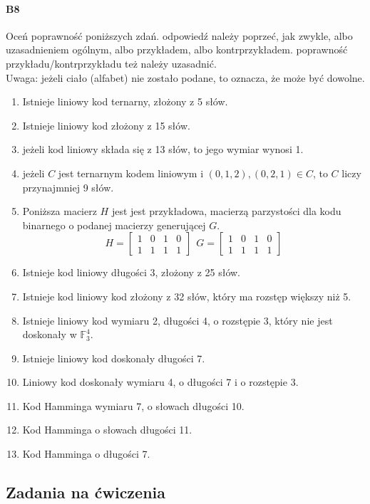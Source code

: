 \paragraph{B8} Oceń poprawność poniższych zdań. odpowiedź należy poprzeć, jak zwykle, albo uzasadnieniem ogólnym, albo przykładem, albo kontrprzykładem. poprawność przykładu/kontrprzykładu też należy uzasadnić. \\Uwaga: jeżeli
ciało (alfabet) nie zostało podane, to oznacza, że może być dowolne.
\begin{enumerate}[label=\alph*)]
\item Istnieje liniowy kod ternarny, złożony z 5 słów.
\item Istnieje liniowy kod złożony z 15 słów.
\item jeżeli kod liniowy składa się z 13 słów, to jego wymiar wynosi 1.
\item jeżeli $C$ jest ternarnym kodem liniowym i $(0, 1, 2),(0, 2, 1) \in C$, to $C$ liczy przynajmniej 9 słów.
\item Poniższa macierz $H$ jest jest przykładowa, macierzą parzystości dla kodu binarnego o podanej macierzy generującej $G$.
$$H =
\begin{bmatrix}
1& 0& 1& 0\\
1& 1 &1& 1 
\end{bmatrix}\ \ 
G =
\begin{bmatrix}
1& 0& 1& 0\\
1& 1& 1& 1 
\end{bmatrix}$$
\item Istnieje kod liniowy długości 3, złożony z 25 słów.
\item Istnieje kod liniowy kod złożony z 32 słów, który ma rozstęp większy niż 5.
\item Istnieje liniowy kod wymiaru 2, długości 4, o rozstępie 3, który nie jest doskonały w $\mathbb{F}^4_3$.
\item Istnieje liniowy kod doskonały długości 7.
\item Liniowy kod doskonały wymiaru 4, o długości 7 i o rozstępie 3.
\item Kod Hamminga wymiaru 7, o słowach długości 10.
\item Kod Hamminga o słowach długości 11.
\item Kod Hamminga o długości 7.
\end{enumerate}

\subsection{Zadania na ćwiczenia}
